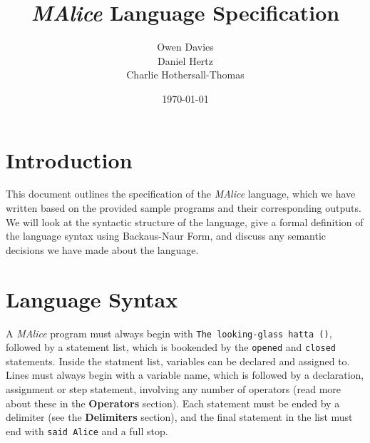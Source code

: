 \documentclass[11pt]{article}
\begin{document}
\title{\huge{\emph{MAlice} Language Specification}}
\author{Owen Davies\\Daniel Hertz\\Charlie Hothersall-Thomas}
\date{\today}

\maketitle

\section*{Introduction}
This document outlines the specification of the \emph{MAlice} language, which we have written based on the provided sample programs and their corresponding outputs. We will look at the syntactic structure of the language, give a formal definition of the language syntax using Backaus-Naur Form, and discuss any semantic decisions we have made about the language.

\section*{Language Syntax}
A \emph{MAlice} program must always begin with \texttt{The looking-glass hatta ()}, followed by a statement list, which is bookended by the \texttt{opened} and \texttt{closed} statements. Inside the statment list, variables can be declared and assigned to. Lines must always begin with a variable name, which is followed by a declaration, assignment or step statement, involving any number of operators (read more about these in the \textbf{Operators} section). Each statement must be ended by a delimiter (see the \textbf{Delimiters} section), and the final statement in the list must end with \texttt{said Alice} and a full stop.
\end{document}
